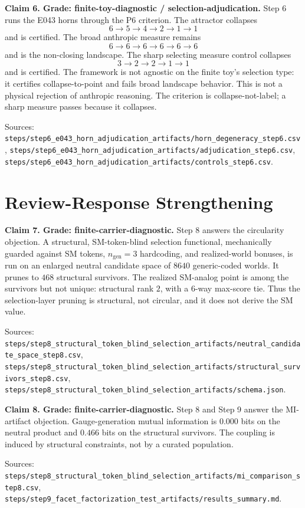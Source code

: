 \documentclass[11pt]{article}
\begin{document}
\textbf{Claim 6. Grade: finite-toy-diagnostic / selection-adjudication.}
Step 6 runs the E043 horns through the P6 criterion. The attractor collapses
\[
6\to5\to4\to2\to1\to1
\]
and is certified. The broad anthropic measure remains
\[
6\to6\to6\to6\to6\to6
\]
and is the non-closing landscape. The sharp selecting measure control collapses
\[
3\to2\to2\to1\to1
\]
and is certified. The framework is not agnostic on the finite toy's selection type: it certifies collapse-to-point and fails broad landscape behavior. This is not a physical rejection of anthropic reasoning. The criterion is collapse-not-label; a sharp measure passes because it collapses.

Sources: \texttt{steps/step6\_e043\_horn\_adjudication\_artifacts/horn\_degeneracy\_step6.csv}, \texttt{steps/step6\_e043\_horn\_adjudication\_artifacts/adjudication\_step6.csv}, \texttt{steps/step6\_e043\_horn\_adjudication\_artifacts/controls\_step6.csv}.

\section{Review-Response Strengthening}

\textbf{Claim 7. Grade: finite-carrier-diagnostic.}
Step 8 answers the circularity objection. A structural, SM-token-blind selection functional, mechanically guarded against SM tokens, \(n_{\mathrm{gen}}=3\) hardcoding, and realized-world bonuses, is run on an enlarged neutral candidate space of \(8640\) generic-coded worlds. It prunes to \(468\) structural survivors. The realized SM-analog point is among the survivors but not unique: structural rank \(2\), with a \(6\)-way max-score tie. Thus the selection-layer pruning is structural, not circular, and it does not derive the SM value.

Sources: \texttt{steps/step8\_structural\_token\_blind\_selection\_artifacts/neutral\_candidate\_space\_step8.csv}, \texttt{steps/step8\_structural\_token\_blind\_selection\_artifacts/structural\_survivors\_step8.csv}, \texttt{steps/step8\_structural\_token\_blind\_selection\_artifacts/schema.json}.

\textbf{Claim 8. Grade: finite-carrier-diagnostic.}
Step 8 and Step 9 answer the MI-artifact objection. Gauge-generation mutual information is \(0.000\) bits on the neutral product and \(0.466\) bits on the structural survivors. The coupling is induced by structural constraints, not by a curated population.

Sources: \texttt{steps/step8\_structural\_token\_blind\_selection\_artifacts/mi\_comparison\_step8.csv}, \texttt{steps/step9\_facet\_factorization\_test\_artifacts/results\_summary.md}.
\end{document}
